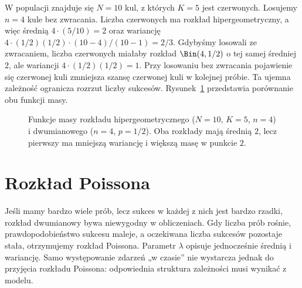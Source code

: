 \begin{przyklad}
W populacji znajduje się $N=10$ kul, z których $K=5$
jest czerwonych. Losujemy $n=4$ kule bez zwracania.
Liczba czerwonych ma rozkład hipergeometryczny,
a więc średnią $4\cdot(5/10)=2$ oraz wariancję
$4\cdot(1/2)(1/2)\cdot(10-4)/(10-1)=2/3$.
Gdybyśmy losowali ze zwracaniem, liczba czerwonych
miałaby rozkład $\Bin(4,1/2)$ o tej samej średniej $2$,
ale wariancji $4\cdot(1/2)(1/2)=1$.
Przy losowaniu bez zwracania pojawienie się czerwonej kuli
zmniejsza szansę czerwonej kuli w kolejnej próbie.
Ta ujemna zależność ogranicza rozrzut liczby sukcesów.
Rysunek~\ref{fig:rp1-06-hypergeom-binomial} przedstawia porównanie obu funkcji masy.
\end{przyklad}

\begin{figure}[htbp]
\centering
{}
\caption{Funkcje masy rozkładu hipergeometrycznego
($N=10$, $K=5$, $n=4$) i dwumianowego ($n=4$, $p=1/2$).
Oba rozkłady mają średnią $2$, lecz pierwszy ma
mniejszą wariancję i większą masę w punkcie $2$.}
\label{fig:rp1-06-hypergeom-binomial}
\end{figure}


\section{Rozkład Poissona}
Jeśli mamy bardzo wiele prób, lecz sukces w każdej z nich jest
bardzo rzadki, rozkład dwumianowy bywa niewygodny w obliczeniach.
Gdy liczba prób rośnie, prawdopodobieństwo sukcesu maleje, a
oczekiwana liczba sukcesów pozostaje stała, otrzymujemy
rozkład Poissona. Parametr $\lambda$ opisuje jednocześnie
średnią i wariancję. Samo występowanie zdarzeń „w czasie” nie
wystarcza jednak do przyjęcia rozkładu Poissona: odpowiednia
struktura zależności musi wynikać z modelu.

